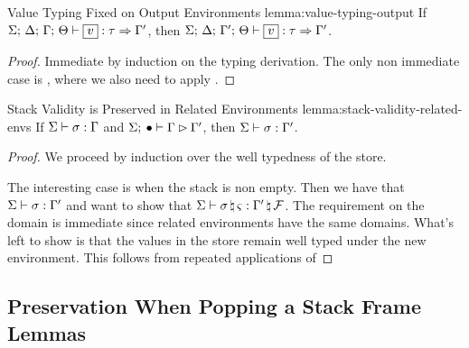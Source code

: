 \begin{oxlemma}{Value Typing Fixed on Output Environments}
  {lemma:value-typing-output} If
  $\oxtypjudge{\oxglobalctx}{\oxtvarctx}{\oxkontctx}{\oxvarctx}{\oxvalue}
  {\oxtype}{\oxvarctx^\prime}$, then
  $\oxtypjudge{\oxglobalctx}{\oxtvarctx}{\oxkontctx}{\oxvarctx^\prime}
  {\oxvalue}{\oxtype}{\oxvarctx^\prime}$.
\end{oxlemma}

\begin{proof}
  Immediate by induction on the typing derivation. The only non immediate case
  is , where we also need to apply
  .
\end{proof}

\begin{oxlemma}{Stack Validity is Preserved in Related Environments}
  {lemma:stack-validity-related-envs} If
  $\Sigma \vdash \sigma : \Gamma$ and
  $\Sigma; \: \bullet \vdash \Gamma \rhd \Gamma^\prime$, then
  $\Sigma \vdash \sigma : \Gamma^\prime$.
\end{oxlemma}

\begin{proof}
  We proceed by induction over the well typedness of the store.

  \vspace{1em}
  \noindent \framebox[\textwidth]{ \figuresize
    \begin{mathpar}
      \VStack\and \VStackEmpty
    \end{mathpar}
  } \vspace{1em}

  The interesting case is when the stack is non empty. Then we have that
  $\Sigma \vdash \sigma : \Gamma^\prime$ and want to show
  that
  $\Sigma \vdash \sigma \, \natural \, \varsigma : \Gamma^\prime \, \natural \, \mathcal{F}$.
  The requirement on the domain is immediate since related environments have the
  same domains. What's left to show is that the values in the store remain well
  typed under the new environment. This follows from repeated applications of
\end{proof}

\subsection{Preservation When Popping a Stack Frame Lemmas}
\label{sec:pop-lemmas}

